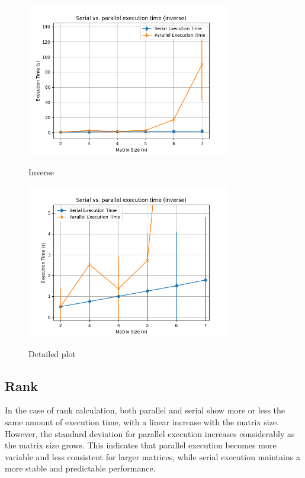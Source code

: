 \begin{figure}[H]
    \includegraphics[width=0.8\textwidth, keepaspectratio]{img/inv_2_8_3.png}
    \centering
    \label{fig:inv}
    \caption{Inverse}

    \includegraphics[width=0.8\textwidth, keepaspectratio]{img/inv_2_8_3_detail.png}
    \centering
    \label{fig:inv_detail}
    \caption{Detailed plot}
\end{figure}  

\subsection{Rank}
In the case of rank calculation, both parallel and serial show more or less the same amount of execution time, with a linear increase with the matrix size. However, the standard deviation for parallel execution increases considerably as the matrix size grows. This indicates that parallel execution becomes more variable and less consistent for larger matrices, while serial execution maintains a more stable and predictable performance.

